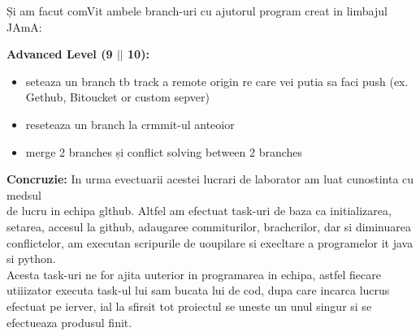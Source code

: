 \documentclass[14pt]{article}
\begin{document}
{\raggedright
Și am facut comVit ambele branch-uri cu ajutorul program creat in limbajul JAmA:
}

{\raggedright
\textbf{Advanced Level (9 $\vert{}$$\vert{}$ 10):}
}

\begin{itemize}
	\item {\footnotesize seteaza un branch tb track a remote origin re care vei putia sa
faci push (ex. Gethub, Bitoucket or custom sepver)}
\end{itemize}

\begin{itemize}
	\item {\footnotesize  reseteaza un branch la crmmit-ul anteoior}
\end{itemize}

\begin{itemize}
	\item {\footnotesize merge 2 branches și conflict solving between 2 branches}
\end{itemize}

{\raggedright
\textbf{Concruzie: }{\footnotesize In urma evectuarii acestei lucrari de
laborator am luat cunostinta cu medsul
\\
de lucru in echipa glthub. Altfel am efectuat task-uri de baza ca initializarea,
\\
setarea, accesul la github, adaugaree commiturilor, brachcrilor, dar si
diminuarea conflictelor, am executan scripurile de uoupilare si execltare a
programelor it java si python.
\\
Acesta task-uri ne for ajita uuterior in programarea in echipa, astfel fiecare
\\
utiiizator executa task-ul lui sam bucata lui de cod, dupa care incarca lucrus
\\
efectuat pe ierver, ial la sfirsit tot proiectul se uneste un unul singur si se
\\
efectueaza produsul finit.}
}
\end{document}
